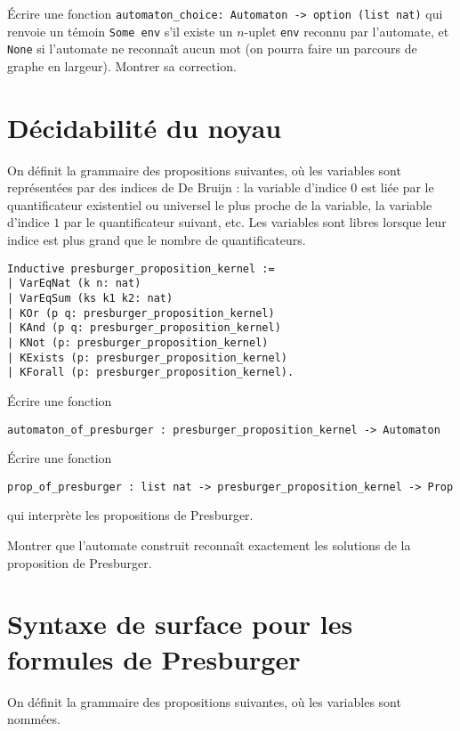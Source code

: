 \documentclass{article}
\begin{document}
Écrire une fonction \texttt{automaton_choice: Automaton -> option (list nat)} qui renvoie un témoin \texttt{Some env} s'il existe un \(n\)-uplet \texttt{env} reconnu par l'automate, et \texttt{None} si l'automate ne reconnaît aucun mot (on pourra faire un parcours de graphe en largeur). Montrer sa correction.

\section{Décidabilité du noyau}

On définit la grammaire des propositions suivantes, où les variables sont représentées par des indices de De Bruijn :
la variable d'indice \(0\) est liée par le quantificateur existentiel ou universel le plus proche de la variable,
la variable d'indice \(1\) par le quantificateur suivant, etc. Les variables sont libres lorsque leur indice est plus grand que le nombre de quantificateurs.

\begin{verbatim}
Inductive presburger_proposition_kernel :=
| VarEqNat (k n: nat)
| VarEqSum (ks k1 k2: nat)
| KOr (p q: presburger_proposition_kernel)
| KAnd (p q: presburger_proposition_kernel)
| KNot (p: presburger_proposition_kernel)
| KExists (p: presburger_proposition_kernel)
| KForall (p: presburger_proposition_kernel).
\end{verbatim}

Écrire une fonction
\begin{verbatim}
automaton_of_presburger : presburger_proposition_kernel -> Automaton
\end{verbatim}

Écrire une fonction
\begin{verbatim}
prop_of_presburger : list nat -> presburger_proposition_kernel -> Prop
\end{verbatim}
qui interprète les propositions de Presburger.

Montrer que l'automate construit reconnaît exactement les solutions de la proposition de Presburger.

\section{Syntaxe de surface pour les formules de Presburger}

On définit la grammaire des propositions suivantes, où les variables sont nommées.
\end{document}
